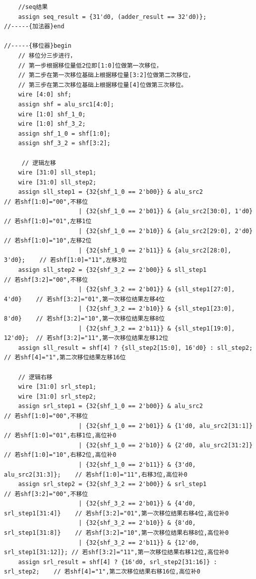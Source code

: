\documentclass{article}
\begin{document}
\begin{verbatim}
    //seq结果
    assign seq_result = {31'd0, (adder_result == 32'd0)};
//-----{加法器}end

//-----{移位器}begin
    // 移位分三步进行，
    // 第一步根据移位量低2位即[1:0]位做第一次移位，
    // 第二步在第一次移位基础上根据移位量[3:2]位做第二次移位，
    // 第三步在第二次移位基础上根据移位量[4]位做第三次移位。
    wire [4:0] shf;
    assign shf = alu_src1[4:0];
    wire [1:0] shf_1_0;
    wire [1:0] shf_3_2;
    assign shf_1_0 = shf[1:0];
    assign shf_3_2 = shf[3:2];
    
     // 逻辑左移
    wire [31:0] sll_step1;
    wire [31:0] sll_step2;
    assign sll_step1 = {32{shf_1_0 == 2'b00}} & alu_src2                   // 若shf[1:0]="00",不移位
                     | {32{shf_1_0 == 2'b01}} & {alu_src2[30:0], 1'd0}     // 若shf[1:0]="01",左移1位
                     | {32{shf_1_0 == 2'b10}} & {alu_src2[29:0], 2'd0}     // 若shf[1:0]="10",左移2位
                     | {32{shf_1_0 == 2'b11}} & {alu_src2[28:0], 3'd0};    // 若shf[1:0]="11",左移3位
    assign sll_step2 = {32{shf_3_2 == 2'b00}} & sll_step1                  // 若shf[3:2]="00",不移位
                     | {32{shf_3_2 == 2'b01}} & {sll_step1[27:0], 4'd0}    // 若shf[3:2]="01",第一次移位结果左移4位
                     | {32{shf_3_2 == 2'b10}} & {sll_step1[23:0], 8'd0}    // 若shf[3:2]="10",第一次移位结果左移8位
                     | {32{shf_3_2 == 2'b11}} & {sll_step1[19:0], 12'd0};  // 若shf[3:2]="11",第一次移位结果左移12位
    assign sll_result = shf[4] ? {sll_step2[15:0], 16'd0} : sll_step2;     // 若shf[4]="1",第二次移位结果左移16位

    // 逻辑右移
    wire [31:0] srl_step1;
    wire [31:0] srl_step2;
    assign srl_step1 = {32{shf_1_0 == 2'b00}} & alu_src2                   // 若shf[1:0]="00",不移位
                     | {32{shf_1_0 == 2'b01}} & {1'd0, alu_src2[31:1]}     // 若shf[1:0]="01",右移1位,高位补0
                     | {32{shf_1_0 == 2'b10}} & {2'd0, alu_src2[31:2]}     // 若shf[1:0]="10",右移2位,高位补0
                     | {32{shf_1_0 == 2'b11}} & {3'd0, alu_src2[31:3]};    // 若shf[1:0]="11",右移3位,高位补0
    assign srl_step2 = {32{shf_3_2 == 2'b00}} & srl_step1                  // 若shf[3:2]="00",不移位
                     | {32{shf_3_2 == 2'b01}} & {4'd0, srl_step1[31:4]}    // 若shf[3:2]="01",第一次移位结果右移4位,高位补0
                     | {32{shf_3_2 == 2'b10}} & {8'd0, srl_step1[31:8]}    // 若shf[3:2]="10",第一次移位结果右移8位,高位补0
                     | {32{shf_3_2 == 2'b11}} & {12'd0, srl_step1[31:12]}; // 若shf[3:2]="11",第一次移位结果右移12位,高位补0
    assign srl_result = shf[4] ? {16'd0, srl_step2[31:16]} : srl_step2;    // 若shf[4]="1",第二次移位结果右移16位,高位补0
 

\end{verbatim}
\end{document}
